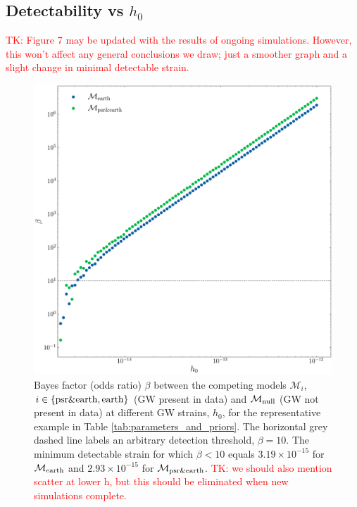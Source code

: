\documentclass[fleqn,usenatbib,useAMS]{mnras}
\begin{document}
\subsection{Detectability vs $h_0$}\label{sec:psr_v_earth_bayes}
		\textcolor{red}{TK: Figure 7 may be updated with the results of ongoing simulations. However, this won't affect any general conclusions we draw; just a smoother graph and a slight change in minimal detectable strain.} \newline 
		\begin{figure}
			\includegraphics[width=\columnwidth, height = \columnwidth ]{images/CanonicalBayesPlot2000} 	
			\caption{Bayes factor (odds ratio) $\beta$ between the competing models $\mathcal{M}_i$, $i \in \left \{ \rm psr \& earth, earth \right \}$ (GW present in data) and $\mathcal{M}_{\rm null}$ (GW not present in data) at different GW strains, $h_0$, for the representative example in Table \ref{tab:parameters_and_priors}. The horizontal grey dashed line labels an arbitrary detection threshold, $\beta = 10$. The minimum detectable strain for which $\beta < 10$ equals $3.19 \times 10^{-15}$ for $\mathcal{M}_{\rm earth}$ and $2.93 \times 10^{-15}$ for $\mathcal{M}_{\rm psr \& earth}$. \textcolor{red}{TK: we should also mention scatter at lower h, but this should be eliminated when new simulations complete.}}
			\label{fig:bayes1}
		\end{figure}
	
\end{document}

